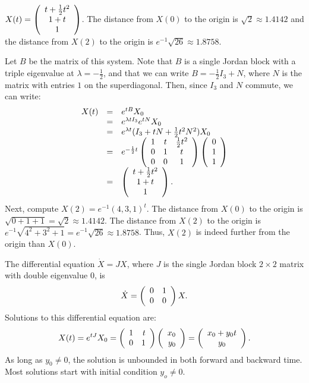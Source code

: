\documentclass{ximera}
\begin{document}
  \ans $X(t) = \left(\begin{array}{c} t + \frac{1}{2}t^2 \\ 1 + t \\ 1\end{array}\right)$. The distance from $X(0)$ to the 
origin is $\sqrt{2} \approx 1.4142$ and the distance from $X(2)$ to the origin is
$e^{-1}\sqrt{26} \approx 1.8758$.

\soln Let $B$ be the matrix of this system.  Note that $B$ is a single Jordan block
with a triple eigenvalue at $\lambda = -\frac{1}{2}$, and that we can write
$B = -\frac{1}{2}I_3 + N$, where $N$ is the matrix with entries $1$ on the
superdiagonal.  Then, since $I_3$ and $N$ commute, we can write:
\[
\begin{array}{rcl}
X(t) & = & e^{tB}X_0 \\
& = & e^{\lambda tI_3}e^{tN}X_0 \\
& = & e^{\lambda t}(I_3 + tN + \frac{1}{2}t^2N^2)X_0 \\
& = & e^{-\frac{1}{2} t}\left(\begin{array}{ccc} 1 & t & \frac{1}{2}t^2 \\ 0 & 1 & t \\ 0 & 0 & 1\end{array}\right)
\left(\begin{array}{r} 0 \\ 1 \\ 1\end{array}\right) \\
& = & \left(\begin{array}{c} t + \frac{1}{2}t^2 \\ 1 + t \\ 1\end{array}\right).
\end{array}
\]
Next, compute $X(2) = e^{-1}(4,3,1)^t$.
The distance from $X(0)$ to the origin is $\sqrt{0 + 1 + 1} = \sqrt{2}
\approx 1.4142$.  The distance from $X(2)$ to the origin is
$e^{-1}\sqrt{4^2 + 3^2 + 1} = e^{-1}\sqrt{26} \approx 1.8758$.
Thus, $X(2)$ is indeed further from the origin than $X(0)$.

  The differential equation $\dot{X}=JX$, where $J$ is the 
single Jordan block $2\times 2$ matrix with double eigenvalue $0$, is
\[
\dot{X} = \left(\begin{array}{rr} 0 & 1\\ 0 &0\end{array}\right)X.
\]
Solutions to this differential equation are:
\[
X(t) = e^{tJ}X_0 = \left(\begin{array}{rr} 1 & t\\ 0 &1\end{array}\right)\left(\begin{array}{r} x_0 \\ y_0\end{array}\right) =
\left(\begin{array}{c} x_0+y_0t \\ y_0\end{array}\right).
\]
As long as $y_0\neq 0$, the solution is unbounded in both forward and 
backward time.  Most solutions start with initial condition $y_o\neq 0$.
\end{document}
